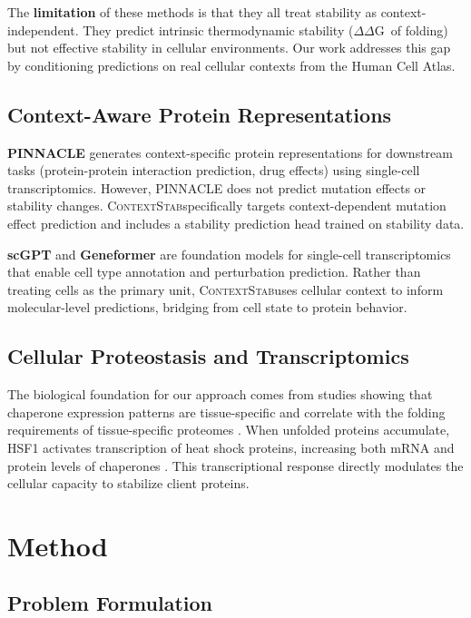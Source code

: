 \documentclass{article}
\newcommand{\ddg}{$\Delta\Delta$G}
\newcommand{\contextstab}{\textsc{ContextStab}}
\begin{document}
The \textbf{limitation} of these methods is that they all treat stability as context-independent. They predict intrinsic thermodynamic stability (\ddg\ of folding) but not effective stability in cellular environments. Our work addresses this gap by conditioning predictions on real cellular contexts from the Human Cell Atlas.

\subsection{Context-Aware Protein Representations}

\textbf{PINNACLE} \citep{li2024pinnacle} generates context-specific protein representations for downstream tasks (protein-protein interaction prediction, drug effects) using single-cell transcriptomics. However, PINNACLE does not predict mutation effects or stability changes. \contextstab specifically targets context-dependent mutation effect prediction and includes a stability prediction head trained on stability data.

\textbf{scGPT} \citep{cui2024scgpt} and \textbf{Geneformer} \citep{theodoris2023geneformer} are foundation models for single-cell transcriptomics that enable cell type annotation and perturbation prediction. Rather than treating cells as the primary unit, \contextstab uses cellular context to inform molecular-level predictions, bridging from cell state to protein behavior.

\subsection{Cellular Proteostasis and Transcriptomics}

The biological foundation for our approach comes from studies showing that chaperone expression patterns are tissue-specific and correlate with the folding requirements of tissue-specific proteomes \citep{brehme2014chaperome}. When unfolded proteins accumulate, HSF1 activates transcription of heat shock proteins, increasing both mRNA and protein levels of chaperones \citep{akerfelt2010hsf1}. This transcriptional response directly modulates the cellular capacity to stabilize client proteins.

\section{Method}
\label{sec:method}

\subsection{Problem Formulation}
\end{document}
